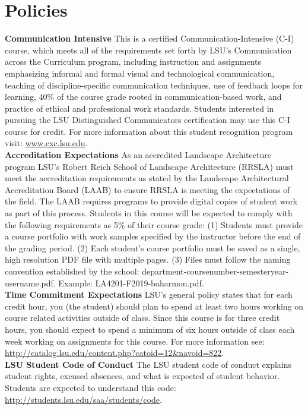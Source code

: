 \documentclass[11pt,article,oneside]{memoir}
\begin{document}
\section{Policies}


\noindent \textbf{Communication Intensive}
This is a certified Communication-Intensive (C-I) course,
which meets all of the requirements set
forth by LSU’s Communication across the Curriculum program, including
 instruction and assignments emphasizing
informal and formal visual and technological communication,
teaching of discipline-specific communication techniques,
use of feedback loops for learning,
40\% of the course grade rooted in communication-based work, and
practice of ethical and professional work standards.
Students interested in pursuing the LSU Distinguished Communicators 
certification may use this C-I course for credit. 
For more information about this student recognition program visit: 
\url{www.cxc.lsu.edu}.\\

\noindent \textbf{Accreditation Expectations}
As an accredited Landscape Architecture program
LSU's Robert Reich School of Landscape Architecture (RRSLA)
must meet the accreditation requirements
as stated by the Landscape Architectural Accreditation
Board (LAAB) to ensure RRSLA is meeting the expectations of the field.
The LAAB requires programs to provide digital copies
of student work as part of this process.
Students in this course will be expected
to comply with the following requirements
as 5\% of their course grade:
(1) Students must provide a course portfolio
with work samples specified by the instructor
before the end of the grading period.
(2) Each student's course portfolio must be saved as
a single, high resolution PDF file with multiple pages.
(3) Files must follow the naming convention
established by the school: department-coursenumber-semesteryear-username.pdf.
Example: LA4201-F2019-baharmon.pdf.\\


\noindent \textbf{Time Commitment Expectations}
LSU's general policy states that for each credit hour, you (the student) should plan to
spend at least two hours working on course related activities outside of class. Since this course is for three credit hours, you should expect to spend a minimum of six hours outside of class each week working on assignments for this course. For more information see:
\url{http://catalog.lsu.edu/content.php?catoid=12&navoid=822}.\\

\noindent \textbf{LSU Student Code of Conduct}
The LSU student code of conduct explains student rights, excused absences, and what is expected of student behavior. Students are expected to understand this code:  \url{http://students.lsu.edu/saa/students/code}.\\ %
\end{document}
